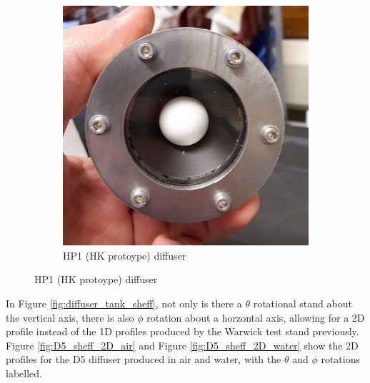 \begin{figure}
      \begin{subfigure}[b]{0.3\linewidth}
      \includegraphics[width=\linewidth]{Figures/HP1_diffuser.PNG}
      \caption{HP1 (HK protoype) diffuser}
      \label{fig:HP1_diffuser}
      \end{subfigure}
\end{figure}

In Figure \ref{fig:diffuser_tank_sheff}, not only is there a $\theta$ rotational stand about the vertical axis, there is also $\phi$ rotation about a horzontal axis, allowing for a 2D profile instead of the 1D profiles produced by the Warwick test stand previously. Figure \ref{fig:D5_sheff_2D_air} and Figure \ref{fig:D5_sheff_2D_water} show the 2D profiles for the D5 diffuser produced in air and water, with the $\theta$ and $\phi$ rotations labelled. 


